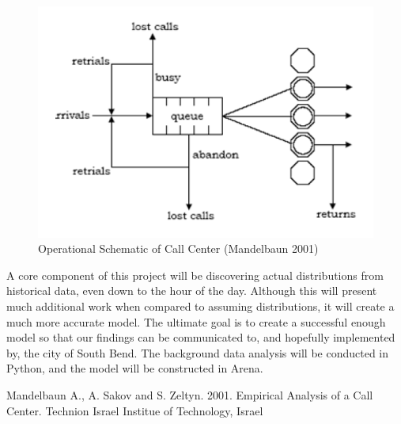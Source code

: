 \documentclass[11pt,twocolumn]{article}
\begin{document}
\begin{figure}[h]
	\includegraphics[scale=.45]{call_center_layout.png}
	\caption{Operational Schematic of Call Center (Mandelbaun 2001)}
\end{figure}

A core component of this project will be discovering actual distributions from historical data, even down to the hour of the day.  Although this will present much additional work when compared to assuming distributions, it will create a much more accurate model.  The ultimate goal is to create a successful enough model so that our findings can be communicated to, and hopefully implemented by, the city of South Bend.  The background data analysis will be conducted in Python, and the model will be constructed in Arena.

\begin{thebibliography}{5}

Mandelbaun A., A. Sakov and S. Zeltyn. 2001. Empirical Analysis of a Call Center. Technion Israel Institue of Technology, Israel

\end{thebibliography}
\end{document}
